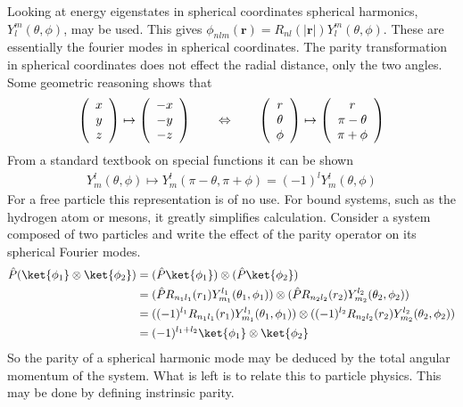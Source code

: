 Looking at energy eigenstates in spherical coordinates spherical harmonics, $Y^m_l(\theta,\phi)$, may be used. This gives $\phi_{nlm}(\mathbf{r})=R_{nl}(|\mathbf{r}|)Y^m_l(\theta,\phi)$. These are essentially the fourier modes in spherical coordinates. The parity transformation in spherical coordinates does not effect the radial distance, only the two angles. Some geometric reasoning shows that
\begin{align*}
\left( \begin{array}{c} x \\ y \\ z \end{array} \right) \mapsto \left( \begin{array}{c} -x \\ -y \\ -z \end{array} \right) \hspace{7mm} \Leftrightarrow \hspace{7mm} \left( \begin{array}{c} r \\ \theta \\ \phi \end{array} \right) \mapsto \left( \begin{array}{c} r \\ \pi-\theta \\ \pi+\phi \end{array} \right)
\end{align*}
From a standard textbook on special functions it can be shown
\begin{align*}
Y^l_m(\theta,\phi)\mapsto Y^l_m(\pi-\theta,\pi+\phi) = (-1)^l Y^l_m(\theta,\phi)
\end{align*}
For a free particle this representation is of no use. For bound systems, such as the hydrogen atom or mesons, it greatly simplifies calculation. Consider a system composed of two particles and write the effect of the parity operator on its spherical Fourier modes.
\begin{align*}
\hat{P}(\ket{\phi_1}\otimes\ket{\phi_2}) &= (\hat{P}\ket{\phi_1})\otimes(\hat{P}\ket{\phi_2}) \\
&=(\hat{P}R_{n_1 l_1}(r_1)Y^{l_1}_{m_1}(\theta_1,\phi_1))\otimes(\hat{P}R_{n_2 l_2}(r_2)Y^{l_2}_{m_2}(\theta_2,\phi_2)) \\
&=((-1)^{l_1}R_{n_1 l_1}(r_1)Y^{l_1}_{m_1}(\theta_1,\phi_1))\otimes((-1)^{l_2}R_{n_2 l_2}(r_2)Y^{l_2}_{m_2}(\theta_2,\phi_2)) \\
&=(-1)^{l_1+l_2}\ket{\phi_1}\otimes\ket{\phi_2}
\end{align*}
So the parity of a spherical harmonic mode may be deduced by the total angular momentum of the system. What is left is to relate this to particle physics. This may be done by defining instrinsic parity.


